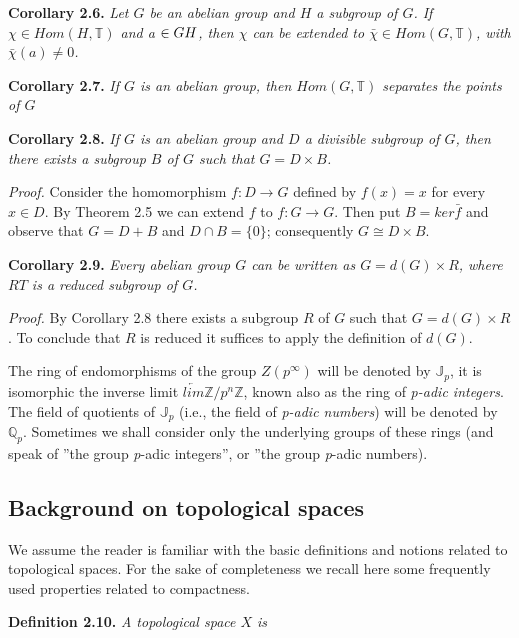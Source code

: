\documentclass[12pt]{article}
\begin{document}
    \textbf{Corollary 2.6.} \emph{Let $ G $ be an abelian group and $ H $ a subgroup of $ G $. If $ \chi \in Hom (H,\mathbb{T}) $ and a $ \in G \\ H $, then $ \chi $
    can be extended to $ \bar{\chi} \in Hom (G,\mathbb{T}) $, with $ \bar{\chi}(a) \neq 0 $.}
    
    
    \textbf{Corollary 2.7.} \emph{If $ G $ is an abelian group, then $ Hom (G,\mathbb{T}) $ separates the points of $ G $}


    \textbf{Corollary 2.8.} \emph{If $ G $ is an abelian group and $ D $ a divisible subgroup of $ G $, then there exists a subgroup $ B $ of $ G $
    such that $ G = D \times B $.}


    \emph{Proof.} Consider the homomorphism $ f : D \to G $ defined by $ f(x) = x $ for every $ x \in D $. By Theorem 2.5 we can
    extend $ f $ to $ f : G \to G $. Then put $ B = ker \bar{f} $ and observe that $ G = D + B $ and $ D \cap B = \{0\} $; consequently
    $ G \cong D \times B $.


    \textbf{Corollary 2.9.} \emph{Every abelian group $ G $ can be written as $ G = d(G) \times R $, where $ RT $ is a reduced subgroup of $ G $.}


    \emph{Proof.} By Corollary 2.8 there exists a subgroup $ R $ of $ G $ such that $ G = d(G) \times R $. To conclude that $ R $ is reduced
    it suffices to apply the definition of $ d(G) $.


        The ring of endomorphisms of the group $ Z(p^{\infty}) $ will be denoted by $ \mathbb{J}_p $, it is isomorphic the inverse limit
    $ \underleftarrow{lim} \mathbb{Z} / p^{n} \mathbb{Z} $, known also as the ring of \emph{p-adic integers}. The field of quotients of $ \mathbb{J}_p $ (i.e., the field of \emph{p-adic
    numbers}) will be denoted by $ \mathbb{Q}_p $. Sometimes we shall consider only the underlying groups of these rings (and
    speak of ”the group \emph{p}-adic integers”, or ”the group \emph{p}-adic numbers).


    \subsection{Background on topological spaces}


        We assume the reader is familiar with the basic definitions and notions related to topological spaces. For the
    sake of completeness we recall here some frequently used properties related to compactness.

    \textbf{Definition 2.10.} \emph{A topological space $ X $ is }
\end{document}
